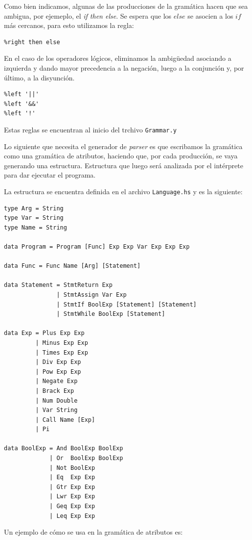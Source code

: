 Como bien indicamos, algunas de las producciones de la gram\'atica hacen
que sea ambigua, por ejemeplo, el \textit{if then else}. Se espera que los $else$
se asocien a los $if$ m\'as cercanos, para esto utilizamos la regla:
\begin{verbatim}
%right then else  
\end{verbatim}


En el caso de los operadores l\'ogicos, eliminamos la ambig\"uedad 
asociando a izquierda y dando mayor precedencia a la negaci\'on, luego
a la conjunci\'on y, por \'ultimo, a la disyunci\'on.
\begin{verbatim}
%left '||'     
%left '&&'   
%left '!'    
\end{verbatim}

Estas reglas se encuentran al inicio del trchivo \texttt{Grammar.y} 

Lo siguiente que necesita el generador de \textit{parser} es que escribamos la gram\'atica 
como una gram\'atica de atributos, haciendo que, por cada producci\'on,
se vaya generando una estructura. Estructura que luego ser\'a analizada
por el int\'erprete para dar ejecutar el programa.

La estructura se encuentra definida en el archivo \texttt{Language.hs} y
es la siguiente:

\begin{verbatim} 
type Arg = String
type Var = String
type Name = String

data Program = Program [Func] Exp Exp Var Exp Exp Exp

data Func = Func Name [Arg] [Statement]

data Statement = StmtReturn Exp
               | StmtAssign Var Exp
               | StmtIf BoolExp [Statement] [Statement]
               | StmtWhile BoolExp [Statement]

data Exp = Plus Exp Exp
         | Minus Exp Exp
         | Times Exp Exp
         | Div Exp Exp
         | Pow Exp Exp
         | Negate Exp
         | Brack Exp
         | Num Double
         | Var String
         | Call Name [Exp]
         | Pi

data BoolExp = And BoolExp BoolExp
             | Or  BoolExp BoolExp
             | Not BoolExp
             | Eq  Exp Exp
             | Gtr Exp Exp
             | Lwr Exp Exp
             | Geq Exp Exp
             | Leq Exp Exp
\end{verbatim}

Un ejemplo de c\'omo se usa en la gram\'atica de atributos es:

